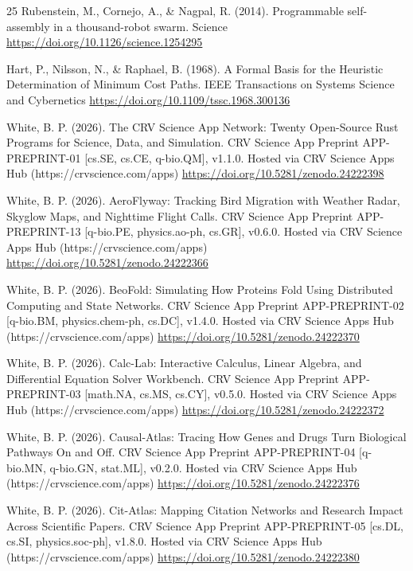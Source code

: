 \documentclass[10pt,letterpaper]{article}
\begin{document}
\begin{thebibliography}{25}
 Rubenstein, M., Cornejo, A., \& Nagpal, R. (2014). Programmable self-assembly in a thousand-robot swarm. Science \url{https://doi.org/10.1126/science.1254295}

 Hart, P., Nilsson, N., \& Raphael, B. (1968). A Formal Basis for the Heuristic Determination of Minimum Cost Paths. IEEE Transactions on Systems Science and Cybernetics \url{https://doi.org/10.1109/tssc.1968.300136}

 White, B. P. (2026). The CRV Science App Network: Twenty Open-Source Rust Programs for Science, Data, and Simulation. CRV Science App Preprint APP-PREPRINT-01 [cs.SE, cs.CE, q-bio.QM], v1.1.0. Hosted via CRV Science Apps Hub (https://crvscience.com/apps) \url{https://doi.org/10.5281/zenodo.24222398}

 White, B. P. (2026). AeroFlyway: Tracking Bird Migration with Weather Radar, Skyglow Maps, and Nighttime Flight Calls. CRV Science App Preprint APP-PREPRINT-13 [q-bio.PE, physics.ao-ph, cs.GR], v0.6.0. Hosted via CRV Science Apps Hub (https://crvscience.com/apps) \url{https://doi.org/10.5281/zenodo.24222366}

 White, B. P. (2026). BeoFold: Simulating How Proteins Fold Using Distributed Computing and State Networks. CRV Science App Preprint APP-PREPRINT-02 [q-bio.BM, physics.chem-ph, cs.DC], v1.4.0. Hosted via CRV Science Apps Hub (https://crvscience.com/apps) \url{https://doi.org/10.5281/zenodo.24222370}

 White, B. P. (2026). Calc-Lab: Interactive Calculus, Linear Algebra, and Differential Equation Solver Workbench. CRV Science App Preprint APP-PREPRINT-03 [math.NA, cs.MS, cs.CY], v0.5.0. Hosted via CRV Science Apps Hub (https://crvscience.com/apps) \url{https://doi.org/10.5281/zenodo.24222372}

 White, B. P. (2026). Causal-Atlas: Tracing How Genes and Drugs Turn Biological Pathways On and Off. CRV Science App Preprint APP-PREPRINT-04 [q-bio.MN, q-bio.GN, stat.ML], v0.2.0. Hosted via CRV Science Apps Hub (https://crvscience.com/apps) \url{https://doi.org/10.5281/zenodo.24222376}

 White, B. P. (2026). Cit-Atlas: Mapping Citation Networks and Research Impact Across Scientific Papers. CRV Science App Preprint APP-PREPRINT-05 [cs.DL, cs.SI, physics.soc-ph], v1.8.0. Hosted via CRV Science Apps Hub (https://crvscience.com/apps) \url{https://doi.org/10.5281/zenodo.24222380}


\end{thebibliography}
\end{document}
